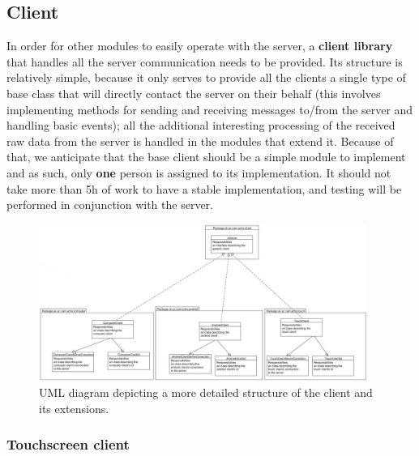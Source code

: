 \documentclass[12p, a4paper, onecolumn]{report}
\begin{document}
\subsection{Client}

In order for other modules to easily operate with the server, a \textbf{client library} that handles all the server communication needs to be provided. Its structure is relatively simple, because it only serves to provide all the clients a single type of base class that will directly contact the server on their behalf (this involves implementing methods for sending and receiving messages to/from the server and handling basic events); all the additional interesting processing of the received raw data from the server is handled in the modules that extend it. Because of that, we anticipate that the base client should be a simple module to implement and as such, only \textbf{one} person is assigned to its implementation. It should not take more than 5h of work to have a stable implementation, and testing will be performed in conjunction with the server.

\begin{figure}[H]
  \centering
  \includegraphics[width=0.955\textwidth]{UMLClient.jpg}
  \caption{UML diagram depicting a more detailed structure of the client and its extensions.}
\end{figure}

\subsubsection{Touchscreen client}
\end{document}
